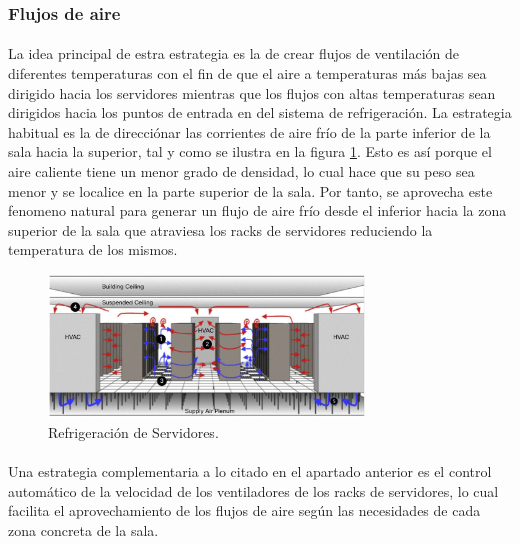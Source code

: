 \documentclass[12pt]{article}
\begin{document}
			\subsubsection{Flujos de aire}

	 			\paragraph{}
				La idea principal de estra estrategia es la de crear flujos de ventilación de diferentes temperaturas con el fin de que el aire a temperaturas más bajas sea dirigido hacia los servidores mientras que los flujos con altas temperaturas sean dirigidos hacia los puntos de entrada en del sistema de refrigeración. La estrategia habitual es la de direcciónar las corrientes de aire frío de la parte inferior de la sala hacia la superior, tal y como se ilustra en la figura \ref{image:refrigeration}. Esto es así porque el aire caliente tiene un menor grado de densidad, lo cual hace que su peso sea menor y se localice en la parte superior de la sala. Por tanto, se aprovecha este fenomeno natural para generar un flujo de aire frío desde el inferior hacia la zona superior de la sala que atraviesa los racks de servidores reduciendo la temperatura de los mismos.

				\begin{figure}[htpb!]
					\begin{center}
						\includegraphics[width=0.75\textwidth]{refrigeration}
						\caption{Refrigeración de Servidores.\cite{cisco:guide}}
						\label{image:refrigeration}
					\end{center}
				\end{figure}

				\paragraph{}
				Una estrategia complementaria a lo citado en el apartado anterior es el control automático de la velocidad de los ventiladores de los racks de servidores, lo cual facilita el aprovechamiento de los flujos de aire según las necesidades de cada zona concreta de la sala.
\end{document}
